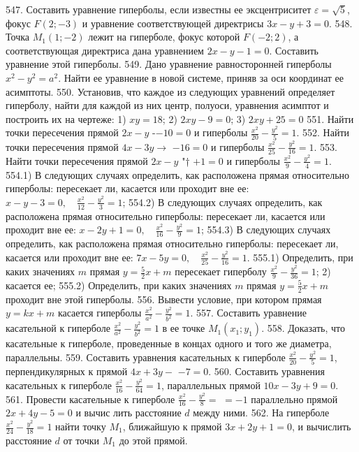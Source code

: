 547. Составить уравнение гиперболы, если известны ее эксцентриситет $\varepsilon=\sqrt{5}$, фокус $F(2 ;-3)$ и уравнение соответствующей директрисы $3 x-y+3=0$.
548. Точка $M_1(1 ;-2)$ лежит на гиперболе, фокус которой $F(-2 ; 2)$, а соответствующая директриса дана уравнением $2 x-y-1=0$. Составить уравнение этой гиперболы.
549. Дано уравнение равносторонней гиперболы $x^2-y^2=a^2$. Найти ее уравнение в новой системе, приняв за оси координат ее асимптоты.
550. Установив, что каждое из следующих уравнений определяет гиперболу, найти для каждой из них центр, полуоси, уравнения асимптот и построить их на чертеже: 1) $x y=18$; 2) $2 x y-9=0$; 3) $2 x y+25=0$
551. Найти точки пересечения прямой $2 x-y$ -$-10=0$ и гиперболы $\frac{x^2}{20}-\frac{y^2}{5}=1$.
552. Найти точки пересечения прямой $4 x-3 y \rightarrow$ $-16=0$ и гиперболы $\frac{x^2}{25}-\frac{y^2}{16}=1$.
553. Найти точки пересечения прямой $2 x-y$ "† $+1=0$ и гиперболы $\frac{x^2}{9}-\frac{y^2}{4}=1$.
554.1) В следующих случаях определить, как расположена прямая относительно гиперболы: пересекает ли, касается или проходит вне ее: $x-y-3=0, \quad \frac{x^2}{12}-\frac{y^2}{3}=1$;
554.2) В следующих случаях определить, как расположена прямая относительно гиперболы: пересекает ли, касается или проходит вне ее: $x-2 y+1=0, \quad \frac{x^2}{16}-\frac{y^2}{9}=1$;
554.3) В следующих случаях определить, как расположена прямая относительно гиперболы: пересекает ли, касается или проходит вне ее: $7 x-5 y=0, \quad \frac{x^2}{25}-\frac{y^2}{16}=1$.
555.1) Определить, при каких значениях $m$ прямая $y=\frac{5}{2} x+m$ пересекает гиперболу $\frac{x^2}{9}-\frac{y^2}{36}=1$; 2) касается ее;
555.2) Определить, при каких значениях $m$ прямая $y=\frac{5}{2} x+m$ проходит вне этой гиперболы.
556. Вывести условие, при котором прямая $y=k x+m$ касается гиперболы $\frac{x^2}{a^2}-\frac{y^2}{b^2}=1$.
557. Составить уравнение касательной к гиперболе $\frac{x^2}{a^2}-\frac{y^2}{b^2}=1$ в ее точке $M_1\left(x_1 ; y_1\right)$.
558. Доказать, что касательные к гиперболе, проведенные в концах одного и того же диаметра, параллельны.
559. Составить уравнения касательных к гиперболе $\frac{x^2}{20}-\frac{y^2}{5}=1$, перпендикулярных к прямой $4 x+3 y-$ $-7=0$.
560. Составить уравнения касательных к гиперболе $\frac{x^2}{16}-\frac{y^2}{64}=1$, параллельных прямой $10 x-3 y+9=0$.
561. Провести касательные к гиперболе $\frac{x^2}{16}-\frac{y^2}{8}=$ $=-1$ параллельно прямой $2 x+4 y-5=0$ и вычис лить расстояние $d$ между ними.
562. На гиперболе $\frac{x^2}{24}-\frac{y^2}{18}=1$ найти точку $M_1$, ближайшую к прямой $3 x+2 y+1=0$, и вычислить расстояние $d$ от точки $M_1$ до этой прямой.
